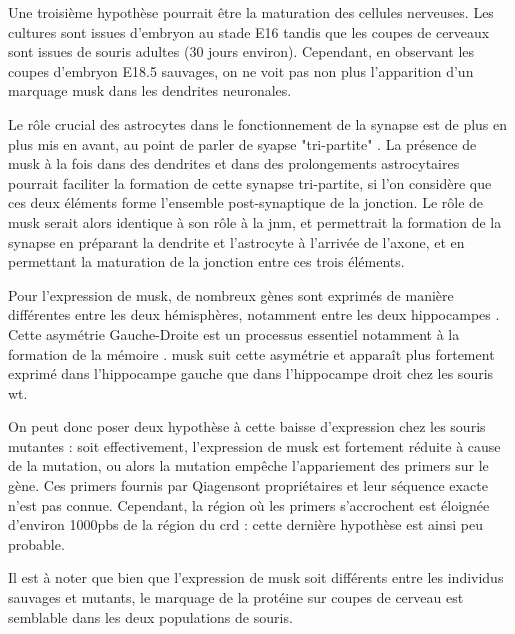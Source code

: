 Une troisième hypothèse pourrait être la maturation des  cellules nerveuses. Les cultures sont issues d'embryon au stade E16 tandis que les coupes de cerveaux sont issues de souris adultes (30 jours environ). Cependant, en observant les coupes d'embryon E18.5 sauvages, on ne voit pas non plus l'apparition d'un marquage \gls{musk} dans les dendrites neuronales.

Le rôle crucial des astrocytes dans le fonctionnement de la synapse est de plus en plus mis en avant, au point de parler de syapse "tri-partite" \cite{Araque1999, Perea2009}. La présence de \gls{musk} à la fois dans des dendrites et dans des prolongements astrocytaires pourrait faciliter la formation de cette synapse tri-partite, si l'on considère que ces deux éléments forme l'ensemble post-synaptique de la jonction. Le rôle de \gls{musk} serait alors identique à son rôle à la \gls{jnm}, et permettrait la formation de la synapse en préparant la dendrite et l'astrocyte à l'arrivée de l'axone, et en permettant la maturation de la jonction entre ces trois éléments.

Pour l'expression de \gls{musk}, de nombreux gènes sont exprimés de manière différentes entre les deux hémisphères, notamment entre les deux hippocampes \cite{Moskal2006}. Cette asymétrie Gauche-Droite est un processus essentiel notamment à la formation de la mémoire \cite{Shimbo2018}. \gls{musk} suit cette asymétrie et apparaît plus fortement exprimé dans l'hippocampe gauche que dans l'hippocampe droit chez les souris \gls{wt}. 

On peut donc poser deux hypothèse à cette baisse d'expression chez les souris mutantes : soit effectivement, l'expression de \gls{musk} est fortement réduite à cause de la mutation, ou alors la mutation empêche l'appariement des primers sur le gène. Ces primers fournis par Qiagen\texttrademark sont propriétaires et leur séquence exacte n'est pas connue. Cependant, la région où les primers s'accrochent est éloignée d'environ 1000pbs de la région du \gls{crd} : cette dernière hypothèse est ainsi peu probable.

Il est à noter que bien que l'expression de \gls{musk} soit différents entre les individus sauvages et mutants, le marquage de la protéine sur coupes de cerveau est semblable dans les deux populations de souris. 